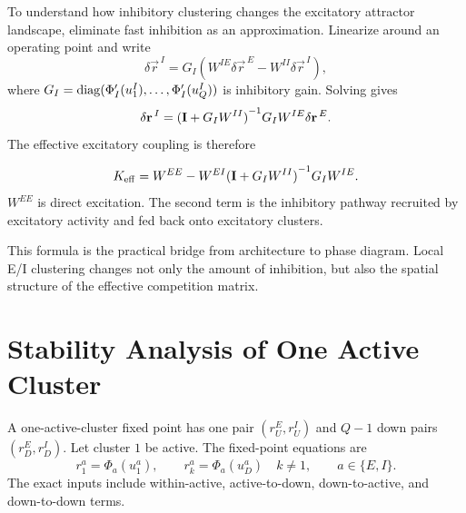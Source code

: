 To understand how inhibitory clustering changes the excitatory attractor landscape, eliminate fast inhibition as an approximation. Linearize around an operating point and write
%
\begin{equation}
  \delta \vec r^{\,I}
  =
  G_I\!\left(
    W^{IE}\delta \vec r^{\,E}
    -
    W^{II}\delta \vec r^{\,I}
  \right),
  \label{eq:fast-i-linear-response}
\end{equation}
%
where $G_I=\operatorname{diag}(\Phi_I'(u_1^I),\ldots,\Phi_I'(u_Q^I))$ is inhibitory gain. Solving gives
%
\begin{equation}
  \delta \mathbf{r}^{\,I}
  =
  {(\mathbf{I}+G_I W^{II})}^{-1}G_I W^{IE}\delta \mathbf{r}^{\,E}.
  \label{eq:fast-i-eliminated}
\end{equation}
%
The effective excitatory coupling is therefore
%
\begin{keyequation}
\begin{equation}
  K_{\mathrm{eff}}
  =
  W^{EE}
  -
  W^{EI}{(\mathbf{I}+G_I W^{II})}^{-1}G_I W^{IE}.
  \label{eq:ei-effective-coupling}
\end{equation}
\tcblower
$W^{EE}$ is direct excitation. The second term is the inhibitory pathway recruited by excitatory activity and fed back onto excitatory clusters.
\end{keyequation}

\noindent This formula is the practical bridge from architecture to phase diagram. Local E/I clustering changes not only the amount of inhibition, but also the spatial structure of the effective competition matrix.

\section{Stability Analysis of One Active Cluster}
\label{sec:stability-analysis-one-active-cluster}

A one-active-cluster fixed point has one pair $(r_U^E,r_U^I)$ and $Q-1$ down pairs $(r_D^E,r_D^I)$. Let cluster $1$ be active. The fixed-point equations are
%
\begin{equation}
  r_1^a=\Phi_a(u_1^a),
  \qquad
  r_k^a=\Phi_a(u_D^a)\quad k\ne 1,
  \qquad
  a\in\{E,I\}.
  \label{eq:one-active-ei-fixed-point}
\end{equation}
%
The exact inputs include within-active, active-to-down, down-to-active, and down-to-down terms.

